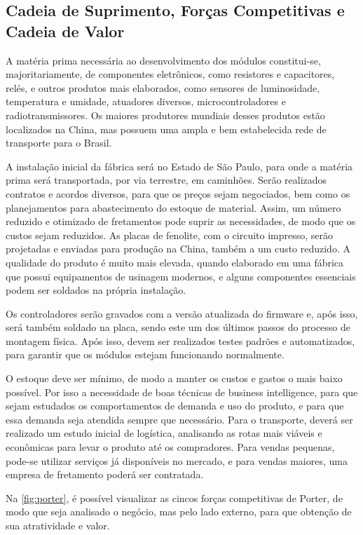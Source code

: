 \subsection{Cadeia de Suprimento, Forças Competitivas e Cadeia de Valor}

A matéria prima necessária ao desenvolvimento dos módulos constitui-se, majoritariamente, de componentes eletrônicos, como resistores e capacitores, relés, e outros produtos mais elaborados, como sensores de luminosidade, temperatura e umidade, atuadores diversos, microcontroladores  e radiotransmissores. Os maiores produtores mundiais desses produtos estão localizados na China, mas possuem uma ampla e bem estabelecida rede de transporte para o Brasil.

A instalação inicial da fábrica será no Estado de São Paulo, para onde a matéria prima será transportada, por via terrestre, em caminhões. Serão realizados contratos e acordos diversos, para que os preços sejam negociados, bem como os planejamentos para abastecimento do estoque de material. Assim, um número reduzido e otimizado de fretamentos pode suprir as necessidades, de modo que os custos sejam reduzidos.
As placas de fenolite, com o circuito impresso, serão projetadas e enviadas para produção na China, também a um custo reduzido. A qualidade do produto é muito mais elevada, quando elaborado em uma fábrica que possui equipamentos de usinagem modernos, e alguns componentes essenciais podem ser soldados na própria instalação.

Os controladores serão gravados com a versão atualizada do firmware e, após isso, será também soldado na placa, sendo este um dos últimos passos do processo de montagem física. Após isso, devem ser realizados testes padrões e automatizados, para garantir que os módulos estejam funcionando normalmente.

O estoque deve ser mínimo, de modo a manter os custos e gastos o mais baixo possível. Por isso a necessidade de boas técnicas de business intelligence, para que sejam estudados os comportamentos de demanda e uso do produto, e para que essa demanda seja atendida sempre que necessário.
Para o transporte, deverá ser realizado um estudo inicial de logística, analisando as rotas mais viáveis e econômicas para levar o produto até os compradores. Para vendas pequenas, pode-se utilizar serviços já disponíveis no mercado, e para vendas maiores, uma empresa de fretamento poderá ser contratada.

Na \autoref{fig:porter}, é possível visualizar as cincos forças competitivas de Porter, de modo que seja analisado o negócio, mas pelo lado externo, para que obtenção de sua atratividade e valor. 

